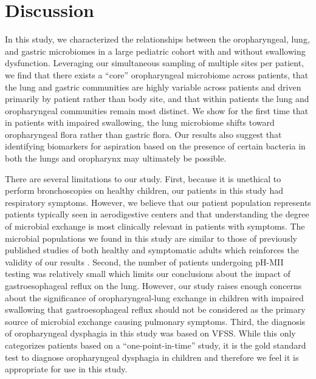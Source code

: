 \FloatBarrier

\section{Discussion}

In this study, we characterized the relationships between the oropharyngeal, lung, and gastric microbiomes in a large pediatric cohort with and without swallowing dysfunction.
Leveraging our simultaneous sampling of multiple sites per patient, we find that there exists a ``core'' oropharyngeal microbiome across patients, that the lung and gastric communities are highly variable across patients and driven primarily by patient rather than body site, and that within patients the lung and oropharyngeal communities remain most distinct.
We show for the first time that in patients with impaired swallowing, the lung microbiome shifts toward oropharyngeal flora rather than gastric flora.
Our results also suggest that identifying biomarkers for aspiration based on the presence of certain bacteria in both the lungs and oropharynx may ultimately be possible.

There are several limitations to our study.
First, because it is unethical to perform bronchoscopies on healthy children, our patients in this study had respiratory symptoms.
However, we believe that our patient population represents patients typically seen in aerodigestive centers and that understanding the degree of microbial exchange is most clinically relevant in patients with symptoms.
The microbial populations we found in this study are similar to those of previously published studies of both healthy and symptomatic adults which reinforces the validity of our results \cite{Bassis2015source,Charlson2011topographical,erbDownward-2011-COPD,morris-2013-healthsmokers}.
Second, the number of patients undergoing pH-MII testing was relatively small which limits our conclusions about the impact of gastroesophageal reflux on the lung.
However, our study raises enough concerns about the significance of oropharyngeal-lung exchange in children with impaired swallowing that gastroesophageal reflux should not be considered as the primary source of microbial exchange causing pulmonary symptoms.
Third, the diagnosis of oropharyngeal dysphagia in this study was based on VFSS.
While this only categorizes patients based on a ``one-point-in-time'' study, it is the gold standard test to diagnose oropharyngeal dysphagia in children and therefore we feel it is appropriate for use in this study.

